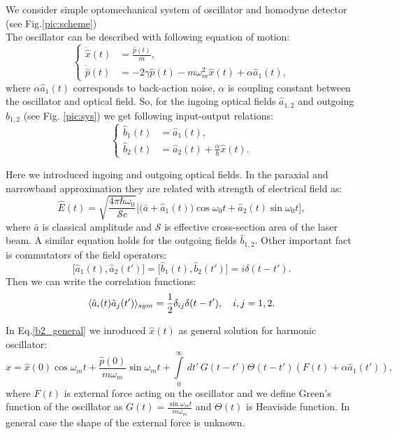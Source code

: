 We consider simple optomechanical system of oscillator and homodyne detector (see Fig.\ref{pic:scheme})\\
The oscillator can be described with following equation of motion:
\begin{equation}
\begin{cases}
 \dot{\hat{x}}(t) &= \frac{\hat{p}(t)}{m},\\
 \dot{\hat{p}}(t) &= -2\gamma \hat{p}(t) - m\omega_m^2 \hat{x}(t) + \alpha \hat{a}_1(t),
\end{cases}
\end{equation}
where $\alpha \hat{a}_1(t)$ corresponds to back-action noise, $\alpha$ is coupling constant between the oscillator and optical field.
So, for the ingoing optical fields $\hat{a}_{1,2}$ and outgoing $\hat{b}_{1,2}$ (see Fig. \ref{pic:sys}) we get following input-output relations:
\begin{equation}
\begin{cases}
 \hat{b}_1(t) &= \hat{a}_1(t),\\
 \hat{b}_2(t) &= \hat{a}_2(t) + \frac{\alpha}{\hbar}\hat{x}(t)\label{b2_general}.
\end{cases}
\end{equation}

Here we introduced ingoing and outgoing optical fields. In the paraxial and narrowband approximation they are related with strength of electrical field as:
\begin{equation}
 \hat{E}(t) = \sqrt{\frac{4\pi \hbar\omega_0}{\mathcal{S} c}} \bigl[\bigl(\bar{a}+\hat{a}_1(t)\bigr)\cos\omega_0t + \hat{a}_2(t)\sin\omega_0t\bigr],
\end{equation}
where $\bar{a}$ is classical amplitude and $\mathcal{S}$ is effective cross-section area of the laser beam. A similar equation holds for the outgoing fields $\hat{b}_{1,2}$.
Other important fact is commutators of the field operators:
\begin{equation}
 \bigl[\hat{a}_1(t),\hat{a}_2(t')\bigl] = \bigl[\hat{b}_1(t),\hat{b}_2(t')\bigl] = i \delta(t-t').
\end{equation}
Then we can write the correlation functions:
\begin{equation}
 \langle\hat{a}_i(t) \hat{a}_j(t')\rangle_{sym} = \frac{1}{2}\delta_{ij}\delta(t-t'), \quad i,j=1,2.
\end{equation}

In Eq.\ref{b2_general} we inroduced $\hat{x}(t)$ as general solution for harmonic oscillator: 
\begin{equation}\label{sol_osc}
  \hat{x} = \hat{x}(0) \cos \omega_m t+ \frac{\hat{p}(0)}{m \omega_m} \sin \omega_m t + \int\limits_0^\infty \, dt' \, G(t-t')\Theta(t-t')(F(t)+\alpha \hat{a}_1(t')),
\end{equation}
where $F(t)$ is external force acting on the oscillator and we define Green's function of the oscillator as $G(t)=\frac{\sin \omega_m t}{m \omega_m}$ and $\Theta(t)$ is Heaviside function.
In general case the shape of the external force is unknown.

